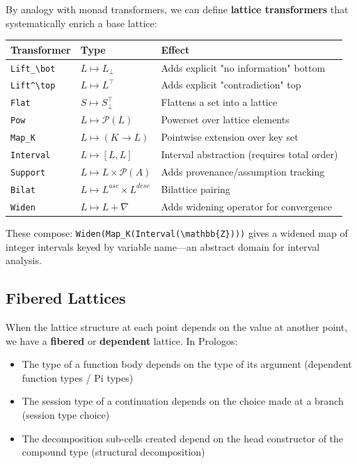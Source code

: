 \documentclass[11pt]{article}
\begin{document}
By analogy with monad transformers, we can define \textbf{lattice transformers} that
systematically enrich a base lattice:

\begin{center}
\begin{tabular}{lll}
Transformer & Type & Effect\\
\hline
\texttt{Lift\_\textbackslash{}bot} & \(L \mapsto L_\bot\) & Adds explicit "no information" bottom\\
\texttt{Lift\textasciicircum{}\textbackslash{}top} & \(L \mapsto L^\top\) & Adds explicit "contradiction" top\\
\texttt{Flat} & \(S \mapsto S_\bot^\top\) & Flattens a set into a lattice\\
\texttt{Pow} & \(L \mapsto \mathcal{P}(L)\) & Powerset over lattice elements\\
\texttt{Map\_K} & \(L \mapsto (K \to L)\) & Pointwise extension over key set\\
\texttt{Interval} & \(L \mapsto [L, L]\) & Interval abstraction (requires total order)\\
\texttt{Support} & \(L \mapsto L \times \mathcal{P}(A)\) & Adds provenance/assumption tracking\\
\texttt{Bilat} & \(L \mapsto L^{asc} \times L^{desc}\) & Bilattice pairing\\
\texttt{Widen} & \(L \mapsto L + \nabla\) & Adds widening operator for convergence\\
\end{tabular}
\end{center}

These compose: \texttt{Widen(Map\_K(Interval(\textbackslash{}mathbb\{Z\})))} gives a widened map of
integer intervals keyed by variable name---an abstract domain for interval
analysis.
\subsection{Fibered Lattices}
\label{sec:org35bd6d8}

When the lattice structure at each point depends on the value at another point,
we have a \textbf{fibered} or \textbf{dependent} lattice. In Prologos:

\begin{itemize}
\item The type of a function body depends on the type of its argument (dependent
function types / Pi types)
\item The session type of a continuation depends on the choice made at a branch
(session type choice)
\item The decomposition sub-cells created depend on the head constructor of the
compound type (structural decomposition)
\end{itemize}
\end{document}

